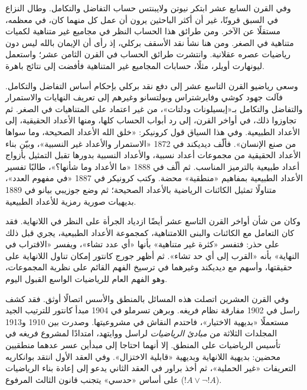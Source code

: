\documentclass[../../../include/open-logic-section]{subfiles}
\begin{document}
وفي القرن السابع عشر ابتكر نيوتن ولايبنتس حساب التفاضل
والتكامل. وطال النزاع في السبق قرونًا، غير أن أكثر الباحثين
يرون أن عمل كل منهما كان، في معظمه، مستقلًا عن الآخر.
ومن طرائق هذا الحساب النظر في مجاميع غير متناهية لكميات
متناهية في الصغر. ومن هنا نشأ نقد الأسقف بركلي، إذ رأى
أن الإيمان بالله ليس دون رياضيات عصره عقلانية. وانتشرت
طرائق الحساب في القرن الثامن عشر؛ واستعمل ليونهارت أويلر،
مثلًا، حسابات المجاميع غير المتناهية فأفضت إلى نتائج باهرة.

وسعى رياضيو القرن التاسع عشر إلى دفع نقد بركلي بإحكام
أساس التفاضل والتكامل. فآلت جهود كوشي وفايرشتراس وبولتسانو
وغيرهم إلى تعريف النهايات والاستمرار والتفاضل والتكامل
بـ«إبسيلونات ودلتات»، من غير اعتماد على المتناهيات في الصغر.
ثم تجاوزوا ذلك، في أواخر القرن، إلى رد أبواب الحساب كلها،
ومنها الأعداد الحقيقية، إلى الأعداد الطبيعية. وفي هذا السياق
قول كرونيكر: «خلق الله الأعداد الصحيحة، وما سواها من صنع الإنسان».
فألّف ديديكند في 1872 «الاستمرار والأعداد غير النسبية»،
وبيّن بناء الأعداد الحقيقية من مجموعات أعداد نسبية، والأعداد
النسبية بدورها تقبل التمثيل بأزواج أعداد طبيعية بالترميز
المناسب. ثم ألّف في 1888 «ما الأعداد وما شأنها؟»، طالبًا
تفسير الأعداد الطبيعية بمفاهيم «منطقية» محضة. وكتب كرونيكر
في 1887 «في مفهوم العدد»، متناولًا تمثيل الكائنات الرياضية
بالأعداد الصحيحة؛ ثم وضع جوزيبي بيانو في 1889 بديهيات
صورية رمزية للأعداد الطبيعية.

وكان من شأن أواخر القرن التاسع عشر أيضًا ازدياد الجرأة على
النظر في اللانهاية. فقد كان التعامل مع الكائنات والبنى
اللامتناهية، كمجموعة الأعداد الطبيعية، يجري قبل ذلك على حذر:
فتفسر «كثرة غير متناهية» بأنها «أي عدد تشاء»، ويفسر
«الاقتراب في النهاية» بأنه «القرب إلى أي حد تشاء». ثم أظهر
جورج كانتور إمكان تناول اللانهاية على حقيقتها، وأسهم مع
ديديكند وغيرهما في ترسيخ الفهم القائم على نظرية المجموعات،
وهو الفهم العام للرياضيات الواسع القبول اليوم.

وفي القرن العشرين اتصلت هذه المسائل بالمنطق والأسس اتصالًا
أوثق. فقد كشف راسل في 1902 مفارقة نظام فريغه. وبرهن تسرملو
في 1904 مبدأ كانتور للترتيب الجيد مستعملًا «بديهية الاختيار»،
فاحتدم النقاش في مشروعيتها. وصدرت بين 1910 و1913 المجلدات
الثلاثة من \emph{مبادئ الرياضيات} لراسل ووايتهد، امتدادًا
لمشروع فريغه في تأسيس الرياضيات على المنطق. إلا أنهما
احتاجا إلى مبدأين عسر عدهما منطقيين محضين: بديهية اللانهاية
وبديهية «قابلية الاختزال». وفي العقد الأول انتقد بوانكاريه
التعريفات «غير الحملية»، ثم أخذ براور في العقد الثاني يدعو
إلى إعادة بناء الرياضيات على أساس «حدسي» يتجنب قانون
الثالث المرفوع ($!A\lor\lnot !A$).
\end{document}

